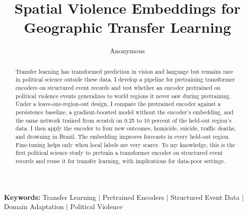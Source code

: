 \documentclass[11pt, letterpaper]{article}
\begin{document}
\begin{titlingpage}
\thispagestyle{empty}
\clearpage\thispagestyle{empty}
\clearpage
\renewcommand{\abstractname}{}
\renewcommand{\absnamepos}{empty}
\title{Spatial Violence Embeddings for Geographic Transfer Learning}\bigskip
\author{Anonymous}
\clearpage\maketitle

\begin{abstract}
Transfer learning has transformed prediction in vision and language but remains rare in political science outside these data. I develop a pipeline for pretraining transformer encoders on structured event records and test whether an encoder pretrained on political violence events generalizes to world regions it never saw during pretraining. Under a leave-one-region-out design, I compare the pretrained encoder against a persistence baseline, a gradient-boosted model without the encoder’s embedding, and the same network trained from scratch on 0.25 to 10 percent of the held-out region’s data. I then apply the encoder to four new outcomes, homicide, suicide, traffic deaths, and drowning in Brazil. The embedding improves forecasts in every held-out region. Fine-tuning helps only when local labels are very scarce. To my knowledge, this is the first political science study to pretrain a transformer encoder on structured event records and reuse it for transfer learning, with implications for data-poor settings.
\end{abstract}
\begin{center}
\textbf{Keywords:} Transfer Learning $|$ Pretrained Encoders $|$ Structured Event Data $|$ Domain Adaptation $|$ Political Violence\\
\end{center}
\end{titlingpage}
\newpage
\clearpage
\doublespacing
\end{document}
